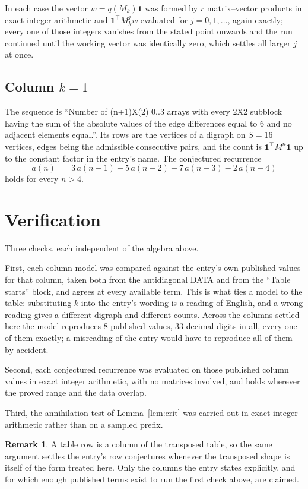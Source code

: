 \documentclass[11pt,a4paper]{article}
\theoremstyle{plain}
\theoremstyle{definition}
\newtheorem{remark}[theorem]{Remark}
\begin{document}
In each case the vector $w=q(M_k)\mathbf{1}$ was formed by $r$ matrix--vector products in
exact integer arithmetic and $\mathbf{1}^{\!\top}M_k^{j}w$ evaluated for $j=0,1,\dots$,
again exactly; every one of those integers vanishes from the stated point onwards and the run
continued until the working vector was identically zero, which settles all larger $j$ at once.

\subsection*{Column $k=1$}
The sequence is ``Number of (n+1)X(2) 0..3 arrays with every 2X2 subblock having the sum of the absolute values of the edge differences equal to 6 and no adjacent elements equal.''. Its rows are the vertices of a digraph on
$S=16$ vertices, edges being the admissible consecutive pairs, and the count is
$\mathbf{1}^{\!\top}M^{n}\mathbf{1}$ up to the constant factor in the entry's name.
The conjectured recurrence
\[
a(n)\;=\;3\,a(n-1) + 5\,a(n-2) - 7\,a(n-3) - 2\,a(n-4)
\]
holds for every $n>4$.

\section{Verification}

Three checks, each independent of the algebra above.

First, each column model was compared against the entry's own published values for that
column, taken both from the antidiagonal DATA and from the ``Table starts'' block, and agrees
at every available term. This is what ties a model to the table: substituting $k$ into the
entry's wording is a reading of English, and a wrong reading gives a different digraph and
different counts. Across the columns settled here the model reproduces $8$ published
values, $33$ decimal digits in all, every one of them exactly; a misreading of the entry
would have to reproduce all of them by accident.

Second, each conjectured recurrence was evaluated on those published column values in exact
integer arithmetic, with no matrices involved, and holds wherever the proved range and the
data overlap.

Third, the annihilation test of Lemma~\ref{lem:crit} was carried out in exact integer
arithmetic rather than on a sampled prefix.

\begin{remark}
A table row is a column of the transposed table, so the same argument settles the entry's row
conjectures whenever the transposed shape is itself of the form treated here. Only the columns
the entry states explicitly, and for which enough published terms exist to run the first check
above, are claimed.
\end{remark}
\end{document}

